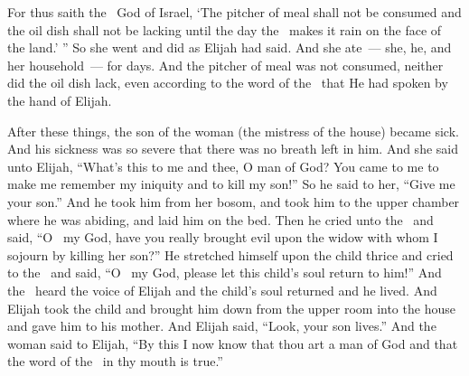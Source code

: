 \begin{inparaenum}
   For thus saith the \lord\ God of Israel, `The pitcher of meal shall not be consumed and the oil dish shall not be lacking until the day the \lord\ makes it rain on the face of the land.' ''%
   So she went and did as Elijah had said. And she ate~--- she, he, and her household~--- for days.%
   And the pitcher of meal was not consumed, neither did the oil dish lack, even according to the word of the \lord\ that He had spoken by the hand of Elijah.%

   After these things, the son of the woman (the mistress of the house) became sick. And his sickness was so severe that there was no breath left in him.%
   And she said unto Elijah, ``What's this to me and thee, O man of God? You came to me to make me remember my iniquity and to kill my son!''%
   So he said to her, ``Give me your son.'' And he took him from her bosom, and took him to the upper chamber where he was abiding, and laid him on the bed.%
   Then he cried unto the \lord\ and said, ``O \lord\ my God, have you really brought evil upon the widow with whom I sojourn by killing her son?''%
   He stretched himself upon the child thrice and cried to the \lord\ and said, ``O \lord\ my God, please let this child's soul return to him!''%
   And the \lord\ heard the voice of Elijah and the child's soul returned and he lived.%
   And Elijah took the child and brought him down from the upper room into the house and gave him to his mother. And Elijah said, ``Look, your son lives.''%
   And the woman said to Elijah, ``By this I now know that thou art a man of God and that the word of the \lord\ in thy mouth is true.''%
\end{inparaenum}

